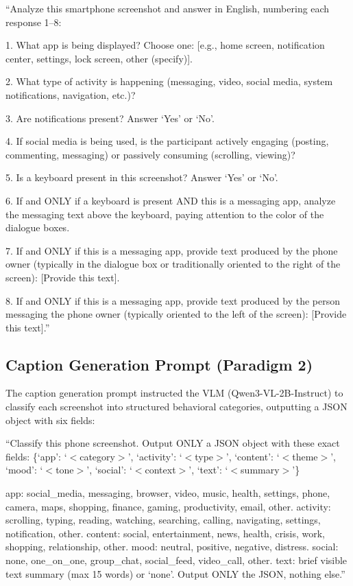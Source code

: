 \documentclass[review,12pt,authoryear]{elsarticle}
\begin{document}
``Analyze this smartphone screenshot and answer in English, numbering each response 1--8:

1. What app is being displayed? Choose one: [e.g., home screen, notification center, settings, lock screen, other (specify)].

2. What type of activity is happening (messaging, video, social media, system notifications, navigation, etc.)?

3. Are notifications present? Answer `Yes' or `No'.

4. If social media is being used, is the participant actively engaging (posting, commenting, messaging) or passively consuming (scrolling, viewing)?

5. Is a keyboard present in this screenshot? Answer `Yes' or `No'.

6. If and ONLY if a keyboard is present AND this is a messaging app, analyze the messaging text above the keyboard, paying attention to the color of the dialogue boxes.

7. If and ONLY if this is a messaging app, provide text produced by the phone owner (typically in the dialogue box or traditionally oriented to the right of the screen): [Provide this text].

8. If and ONLY if this is a messaging app, provide text produced by the person messaging the phone owner (typically oriented to the left of the screen): [Provide this text].''

\subsection{Caption Generation Prompt (Paradigm 2)}\label{app:caption_prompt}

The caption generation prompt instructed the VLM (Qwen3-VL-2B-Instruct) to classify each screenshot into structured behavioral categories, outputting a JSON object with six fields:

``Classify this phone screenshot. Output ONLY a JSON object with these exact fields: \{`app': `$<$category$>$', `activity': `$<$type$>$', `content': `$<$theme$>$', `mood': `$<$tone$>$', `social': `$<$context$>$', `text': `$<$summary$>$'\}

app: social\_media, messaging, browser, video, music, health, settings, phone, camera, maps, shopping, finance, gaming, productivity, email, other. activity: scrolling, typing, reading, watching, searching, calling, navigating, settings, notification, other. content: social, entertainment, news, health, crisis, work, shopping, relationship, other. mood: neutral, positive, negative, distress. social: none, one\_on\_one, group\_chat, social\_feed, video\_call, other. text: brief visible text summary (max 15 words) or `none'. Output ONLY the JSON, nothing else.''
\end{document}
